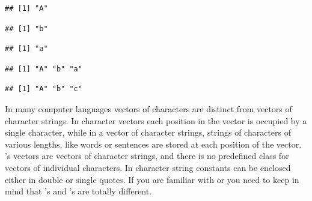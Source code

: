 \documentclass[krantz2]{krantz}\usepackage{knitr}%
\begin{document}
\begin{knitrout}\footnotesize
{}\color{fgcolor}\begin{kframe}
\begin{alltt}
 \hlkwb{<-} 
 \hlkwb{<-} \hlstd{letters[}\hlstd{]}
 \hlkwb{<-} \hlstd{letters[}\hlstd{]}
\end{alltt}
\begin{verbatim}
## [1] "A"
\end{verbatim}
\begin{alltt}
\end{alltt}
\begin{verbatim}
## [1] "b"
\end{verbatim}
\begin{alltt}
\end{alltt}
\begin{verbatim}
## [1] "a"
\end{verbatim}
\begin{alltt}
 \hlkwb{<-} 
\end{alltt}
\begin{verbatim}
## [1] "A" "b" "a"
\end{verbatim}
\begin{alltt}
 \hlkwb{<-}  \hlstd{)}
\end{alltt}
\begin{verbatim}
## [1] "A" "b" "c"
\end{verbatim}
\begin{alltt}
 \hlkwb{<-} 
 \hlopt{+} \hlstd{)}
\end{alltt}
\end{kframe}
\end{knitrout}

\begin{explainbox}
In many computer languages vectors of characters are distinct from vectors of character strings. In character vectors each position in the vector is occupied by a single character, while in a vector of character strings, strings of characters of various lengths, like words or sentences are stored at each position of the vector. \Rlang's  vectors are vectors of character strings, and there is no predefined class for vectors of individual characters. In \Rlang character string constants can be enclosed either in double or single quotes. If you are familiar with \Clang or \Cpplang you need to keep in mind that \Clang's  and \Rlang's  are totally different.
\end{explainbox}
\end{document}
